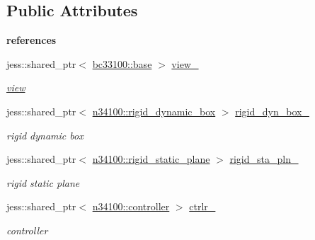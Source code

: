 \subsection*{Public Attributes}
\begin{Indent}{\bf references}\par
{\em \label{_amgrp44a2dc91e1e21b653fd7ff6c63eca555}
 }\begin{DoxyCompactItemize}
\item 
jess::shared\_\-ptr$<$ \hyperlink{classbox__client_1_1content_1_1view_1_1admin_1_1base}{bc33100::base} $>$ \hyperlink{classbox__client_1_1content_1_1scene_1_1admin_1_1base_a69b7d7f28a50ffb0d6a3b20df5d9d734}{view\_\-}
\begin{DoxyCompactList}\small\item\em \hyperlink{namespacebox__client_1_1content_1_1view}{view} \item\end{DoxyCompactList}\item 
jess::shared\_\-ptr$<$ \hyperlink{classnebula_1_1content_1_1actor_1_1admin_1_1rigid__dynamic__box}{n34100::rigid\_\-dynamic\_\-box} $>$ \hyperlink{classbox__client_1_1content_1_1scene_1_1admin_1_1base_a69268221fb3d31b951f15d3813365764}{rigid\_\-dyn\_\-box\_\-}
\begin{DoxyCompactList}\small\item\em rigid dynamic box \item\end{DoxyCompactList}\item 
jess::shared\_\-ptr$<$ \hyperlink{classnebula_1_1content_1_1actor_1_1admin_1_1rigid__static__plane}{n34100::rigid\_\-static\_\-plane} $>$ \hyperlink{classbox__client_1_1content_1_1scene_1_1admin_1_1base_acf6b0223ff38612272ceba5708e4d15a}{rigid\_\-sta\_\-pln\_\-}
\begin{DoxyCompactList}\small\item\em rigid static plane \item\end{DoxyCompactList}\item 
jess::shared\_\-ptr$<$ \hyperlink{classnebula_1_1content_1_1actor_1_1admin_1_1controller}{n34100::controller} $>$ \hyperlink{classbox__client_1_1content_1_1scene_1_1admin_1_1base_a5f50336d66a915f60f7da37d558ff9fb}{ctrlr\_\-}
\begin{DoxyCompactList}\small\item\em controller \item\end{DoxyCompactList}\end{DoxyCompactItemize}
\end{Indent}


